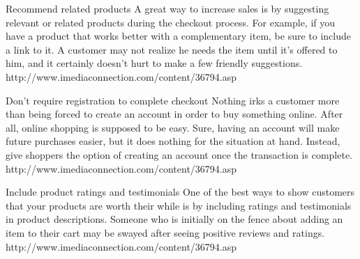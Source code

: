 Recommend related products
A great way to increase sales is by suggesting relevant or related products during the checkout process. For example, if you have a product that works better with a complementary item, be sure to include a link to it. A customer may not realize he needs the item until it's offered to him, and it certainly doesn't hurt to make a few friendly suggestions.
http://www.imediaconnection.com/content/36794.asp



Don't require registration to complete checkout
Nothing irks a customer more than being forced to create an account in order to buy something online. After all, online shopping is supposed to be easy. Sure, having an account will make future purchases easier, but it does nothing for the situation at hand. Instead, give shoppers the option of creating an account once the transaction is complete.
http://www.imediaconnection.com/content/36794.asp

Include product ratings and testimonials
One of the best ways to show customers that your products are worth their while is by including ratings and testimonials in product descriptions. Someone who is initially on the fence about adding an item to their cart may be swayed after seeing positive reviews and ratings.
http://www.imediaconnection.com/content/36794.asp








